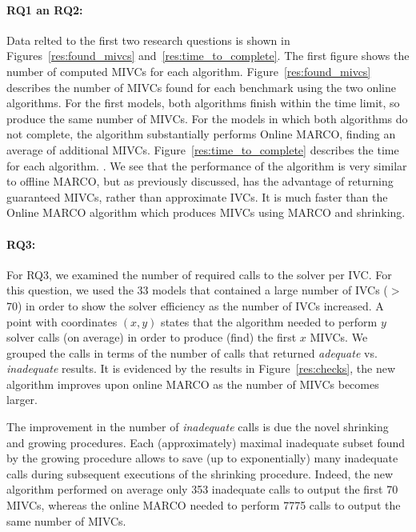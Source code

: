 \paragraph{RQ1 an RQ2:}
Data relted to the first two research questions is shown in Figures~\ref{res:found_mivcs} and~\ref{res:time_to_complete}.  The first figure shows the number of computed MIVCs for each algorithm.    Figure~\ref{res:found_mivcs} describes the number of MIVCs found for each benchmark using the two online algorithms.  For the first  models, both algorithms finish within the time limit, so produce the same number of MIVCs.  For the  models in which both algorithms do not complete, the  algorithm substantially performs Online MARCO, finding an average of  additional MIVCs. Figure~\ref{res:time_to_complete} describes the time for each algorithm. .  We see that the performance of the  algorithm is very similar to offline MARCO, but as previously discussed, has the advantage of returning guaranteed MIVCs, rather than approximate IVCs.  It is much faster than the Online MARCO algorithm which produces MIVCs using MARCO and shrinking.

\paragraph{RQ3:}  For RQ3, we examined the number of required calls to the solver per IVC.  For this question, we used the 33 models that contained a large number of IVCs ($>$70) in order to show the solver efficiency as the number of IVCs increased.  A point with coordinates $(x,y)$ states that the algorithm needed to perform $y$ solver calls (on average) in order to produce (find) the first $x$ MIVCs. We grouped the calls in terms of the number of calls that returned {\em adequate} vs. {\em inadequate} results.  It is evidenced by the results in Figure~\ref{res:checks}, the new algorithm improves upon online MARCO as the number of MIVCs becomes larger. 

The improvement in the number of \emph{inadequate} calls is due the novel shrinking and growing procedures. 
Each (approximately) maximal inadequate subset found by the growing procedure allows to save (up to exponentially) many inadequate calls during subsequent executions of the shrinking procedure.
Indeed, the new algorithm performed on average only 353 inadequate calls to output the first 70 MIVCs, whereas the online MARCO needed to perform 7775 calls to output the same number of MIVCs. 

